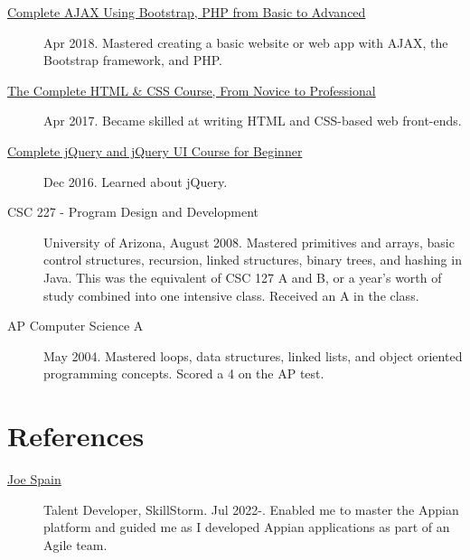 \documentclass{article}
\begin{document}
\begin{description}
  \item [\href{https://www.udemy.com/certificate/UC-E3EMJE4O}{Complete AJAX Using Bootstrap, PHP from Basic to Advanced}] Apr 2018. Mastered creating a basic website or web app with AJAX, the Bootstrap framework, and PHP.
  \item [\href{https://www.udemy.com/certificate/UC-QZDWYX3V}{The Complete HTML \& CSS Course, From Novice to Professional}] Apr 2017. Became skilled at writing HTML and CSS-based web front-ends.
  \item [\href{https://www.udemy.com/certificate/UC-4V285L2N}{Complete jQuery and jQuery UI Course for Beginner}] Dec 2016. Learned about jQuery.
  \item [CSC 227 - Program Design and Development] University of Arizona, August 2008. Mastered primitives and arrays, basic control structures, recursion, linked structures, binary trees, and hashing in Java. This was the equivalent of CSC 127 A and B, or a year's worth of study combined into one intensive class. Received an A in the class.
  \item [AP Computer Science A] May 2004. Mastered loops, data structures, linked lists, and object oriented programming concepts. Scored a 4 on the AP test.
\end{description}

\vspace{-1em}
\section*{References}\vspace{-0.5em}
\begin{description}
  \item [\href{https://www.linkedin.com/in/joespain/}{Joe Spain}] Talent Developer, SkillStorm. Jul 2022-. Enabled me to master the Appian platform and guided me as I developed Appian applications as part of an Agile team.
\end{description}
\end{document}
